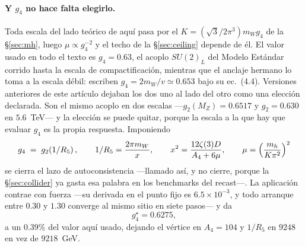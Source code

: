 \documentclass[11pt,a4paper]{article}
\newcommand{\su}[1]{SU(#1)}
\begin{document}
\paragraph{Y $g_4$ no hace falta elegirlo.} Toda escala del lado teórico de aquí pasa por el
$K=(\sqrt3/2\pi^3)m_Wg_4$ de la \S\ref{sec:mh}, luego $\mu\propto g_4^{-2}$ y el techo de la
\S\ref{sec:ceiling} depende de él. El valor usado en todo el texto es $g_4=0.63$, el acoplo
$\su2_L$ del Modelo Estándar corrido hasta la escala de compactificación, mientras que el anclaje
hermano lo toma a la escala débil: \cite{AHMN} escriben $g_4=2m_W/v\simeq0.653$ bajo su ec.~(4.4).
Versiones anteriores de este artículo dejaban los dos uno al lado del otro como una elección
declarada. Son el mismo acoplo en dos escalas ---$g_2(M_Z)=0.6517$ y $g_2=0.630$ en $5.6$~TeV--- y
la elección se puede quitar, porque la escala a la que hay que evaluar $g_4$ es la propia respuesta.
Imponiendo
\begin{equation}\label{eq:g4fix}
  g_4\;=\;g_2\!\left(1/R_5\right),\qquad 1/R_5=\frac{2\pi m_W}{x},\qquad
  x^2=\frac{12\zeta(3)D}{A_4+6\mu},\qquad \mu=\Bigl(\frac{m_h}{K\pi^2}\Bigr)^{2}
\end{equation}
se cierra el lazo de autoconsistencia ---llamado así, y no cierre, porque la
\S\ref{sec:collider} ya gasta esa palabra en los benchmarks del recast---. La aplicación contrae
con fuerza ---su derivada en el punto fijo es
$6.5\times10^{-3}$, y todo arranque entre $0.30$ y $1.30$ converge al mismo sitio en siete pasos---
y da
\begin{equation}\label{eq:g4star}
  g_4^\star=0.6275 ,
\end{equation}
a un $0.39\%$ del valor aquí usado, dejando el vértice en $A_4=104$ y $1/R_5$ en $9248$ en vez de
$9218$~GeV.
\end{document}
